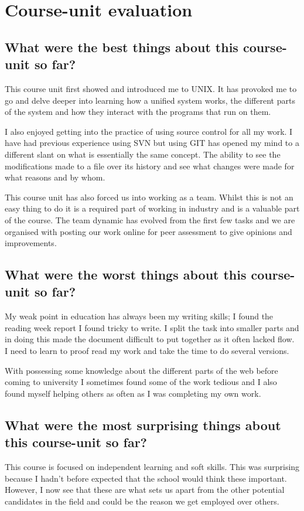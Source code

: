\documentclass[12pt]{article}
\begin{document}
\maketitle
  \section{Course-unit evaluation}
    \subsection{What were the best things about this course-unit so far?}
      This course unit first showed and introduced me to UNIX. It has provoked
      me to go and delve deeper into learning how a unified system works, the
      different parts of the system and how they interact with the programs
      that run on them.
      
      I also enjoyed getting into the practice of using source control for 
      all my work. I have had previous experience using SVN but using GIT has
      opened my mind to a different slant on what is essentially the same 
      concept. The ability to see the modifications made to a file over its
      history and see what changes were made for what reasons and by whom.
      
      This course unit has also forced us into working as a team. Whilst this is
      not an easy thing to do it is a required part of working in industry and
      is a valuable part of the course. The team dynamic has evolved from the
      first few tasks and we are organised with posting our work online for peer
      assessment to give opinions and improvements.
    \subsection{What were the worst things about this course-unit so far?}
      My weak point in education has always been my writing skills; I found the
      reading week report I found tricky to write. I split the task into smaller
      parts and in doing this made the document difficult to put together as it
      often lacked flow. I need to learn to proof read my work and take the time
      to do several versions.
      
      With possessing some knowledge about the different parts of the web before
      coming to university I sometimes found some of the work tedious and I also
      found myself helping others as often as I was completing my own work.
    \subsection{What were the most surprising things about this course-unit so
      far?}
      This course is focused on independent learning and soft skills. This was
      surprising because I hadn't before expected that the school would think
      these important. However, I now see that these are what sets us apart from
      the other potential candidates in the field and could be the reason we get
      employed over others.
\end{document}
